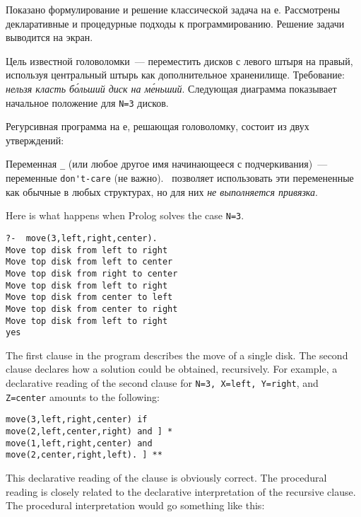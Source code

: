 
Показано формулирование и решение классической задача на \prolog е. Рассмотрены
декларативные и процедурные подходы к программированию. Решение задачи выводится
на экран.

Цель известной головоломки\ --- переместить  дисков с левого штыря на
правый, используя центральный штырь как дополнительное храненилище. Требование:
\emph{нельзя класть б\'{о}льший диск на м\'{е}ньший}. Следующая диаграмма
показывает начальное положение для \verb|N=3| дисков.


Регурсивная программа на \prolog е, решающая головоломку, состоит из двух
утверждений:


Переменная \verb'_' (или любое другое имя начинающееся с подчеркивания)\ --- 
переменные \verb|don't-care| (не важно). \prolog\ позволяет использовать
эти перемененные как обычные в любых структурах, но для них \emph{не выполняется
привязка}.

Here is what happens when Prolog solves the case \verb|N=3|.

\begin{verbatim}
?-  move(3,left,right,center). 
Move top disk from left to right 
Move top disk from left to center 
Move top disk from right to center 
Move top disk from left to right 
Move top disk from center to left 
Move top disk from center to right 
Move top disk from left to right 
yes
\end{verbatim}

The first clause in the program describes the move of a single disk. The second
clause declares how a solution could be obtained, recursively. For example, a
declarative reading of the second clause for \verb|N=3, X=left, Y=right|, and
\verb|Z=center| amounts to the following:

\begin{verbatim}
move(3,left,right,center) if 
move(2,left,center,right) and ] * 
move(1,left,right,center) and 
move(2,center,right,left). ] ** 
\end{verbatim}

This declarative reading of the clause is obviously correct. The procedural
reading is closely related to the declarative interpretation of the recursive
clause. The procedural interpretation would go something like this:

